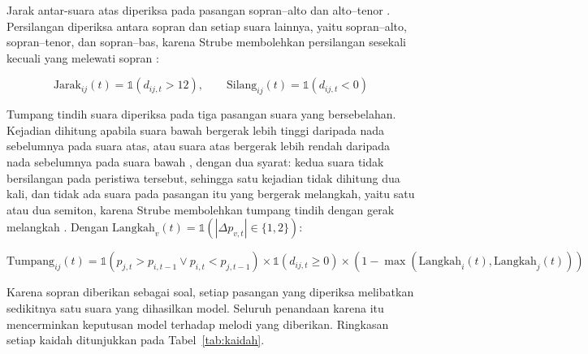 Jarak antar-suara atas diperiksa pada pasangan sopran--alto dan alto--tenor \parencite[20]{strube1928}. Persilangan diperiksa antara sopran dan setiap suara lainnya, yaitu sopran--alto, sopran--tenor, dan sopran--bas, karena Strube membolehkan persilangan sesekali kecuali yang melewati sopran \parencite[174]{strube1928}:

{\small
\begin{equation}
\text{Jarak}_{ij}(t) = \mathds{1}\left(d_{ij,t} > 12\right), \qquad \text{Silang}_{ij}(t) = \mathds{1}\left(d_{ij,t} < 0\right)
\end{equation}
}

Tumpang tindih suara diperiksa pada tiga pasangan suara yang bersebelahan. Kejadian dihitung apabila suara bawah bergerak lebih tinggi daripada nada sebelumnya pada suara atas, atau suara atas bergerak lebih rendah daripada nada sebelumnya pada suara bawah \parencite[12]{strube1928}, dengan dua syarat: kedua suara tidak bersilangan pada peristiwa tersebut, sehingga satu kejadian tidak dihitung dua kali, dan tidak ada suara pada pasangan itu yang bergerak melangkah, yaitu satu atau dua semiton, karena Strube membolehkan tumpang tindih dengan gerak melangkah \parencite[12--13]{strube1928}. Dengan $\text{Langkah}_{v}(t) = \mathds{1}\left(|\Delta p_{v,t}| \in \{1, 2\}\right)$:

{\small
\begin{equation}
\text{Tumpang}_{ij}(t) = \mathds{1}\left(p_{j,t} > p_{i,t-1} \lor p_{i,t} < p_{j,t-1}\right) \times \mathds{1}\left(d_{ij,t} \geq 0\right) \times \left(1 - \max\left(\text{Langkah}_{i}(t), \text{Langkah}_{j}(t)\right)\right)
\end{equation}
}

Karena sopran diberikan sebagai soal, setiap pasangan yang diperiksa melibatkan sedikitnya satu suara yang dihasilkan model. Seluruh penandaan karena itu mencerminkan keputusan model terhadap melodi yang diberikan. Ringkasan setiap kaidah ditunjukkan pada Tabel~\ref{tab:kaidah}.

